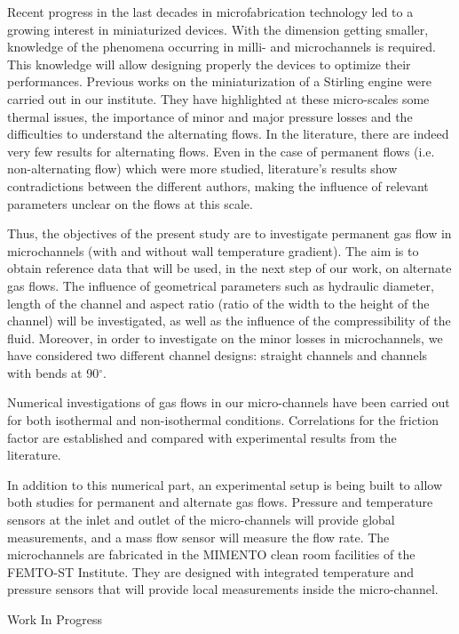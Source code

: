 {\normalsize
Recent progress in the last decades in microfabrication technology led to a growing interest in miniaturized devices. With the dimension getting smaller, knowledge of the phenomena occurring in milli- and microchannels is required. This knowledge will allow designing properly the devices to optimize their performances. Previous works on the miniaturization of a Stirling engine were carried out in our institute. They have highlighted at these micro-scales some thermal issues, the importance of minor and major pressure losses and the difficulties to understand the alternating flows. In the literature, there are indeed very few results for alternating flows. Even in the case of permanent flows (i.e. non-alternating flow) which were more studied, literature's results show contradictions between the different authors, making the influence of relevant parameters unclear on the flows at this scale.







Thus, the objectives of the present study are to investigate permanent gas flow in microchannels (with and without wall temperature gradient). The aim is to obtain reference data that will be used, in the next step of our work, on alternate gas flows. The influence of geometrical parameters such as hydraulic diameter, length of the channel and aspect ratio (ratio of the width to the height of the channel) will be investigated, as well as the influence of the compressibility of the fluid. Moreover, in order to investigate on the minor losses in microchannels, we have considered two different channel designs: straight channels and channels with bends at 90$^{\circ}$.







Numerical investigations of gas flows in our micro-channels have been carried out for both isothermal and non-isothermal conditions. Correlations for the friction factor are established and compared with experimental results from the literature.







In addition to this numerical part, an experimental setup is being built to allow both studies for permanent and alternate gas flows. Pressure and temperature sensors at the inlet and outlet of the micro-channels will provide global measurements, and a mass flow sensor will measure the flow rate. The microchannels are fabricated in the MIMENTO clean room facilities of the FEMTO-ST Institute. They are designed with integrated temperature and pressure sensors that will provide local measurements inside the micro-channel.

 \vfill Work In Progress

}
 
